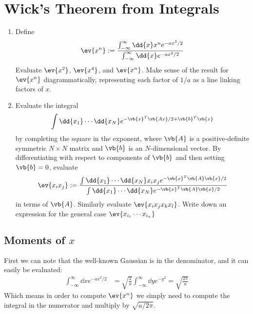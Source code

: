 \documentclass[12pt]{article}
\begin{document}
\section{Wick's Theorem from Integrals}
\begin{problem}
  \begin{enumerate}
  \item Define
    \begin{align*}
      \ev{x^n}:=\frac{\int_{-\infty}^\infty\dd{x}x^ne^{-ax^2/2}}{\int_{-\infty}^\infty\dd{x}e^{-ax^2/2}}
    \end{align*}
    Evaluate $\ev{x^2}$, $\ev{x^4}$, and $\ev{x^n}$. Make sense of the result for $\ev{x^n}$ diagrammatically, representing each factor of $1/a$ as a line linking factors of $x$.
  \item Evaluate the integral
    \begin{align*}
      \int\dd{x_1}\cdots\dd{x_N}e^{-\vb{x}^T\vb{Ax}/2+\vb{b}^T\vb{x}}
    \end{align*}
    by completing the square in the exponent, where $\vb{A}$ is a positive-definite symmetric $N\times N$ matrix and $\vb{b}$ is an $N$-dimensional vector. By differentiating with respect to components of $\vb{b}$ and then setting $\vb{b}=0$, evaluate
    \begin{align*}
      \ev{x_ix_j}:=\frac{\int\dd{x_1}\cdots\dd{x_N}x_ix_je^{-\vb{x}^T\vb{A}\vb{x}/2}}{\int\dd{x_1}\cdots\dd{x_N}e^{-\vb{x}^T\vb{A}\vb{x}/2}}
    \end{align*}
    in terms of $\vb{A}$. Similarly evaluate $\ev{x_ix_jx_kx_l}$. Write down an expression for the general case $\ev{x_{i_1}\cdots x_{i_n}}$
  \end{enumerate}
\end{problem}
\subsection{Moments of $x$}
First we can note that the well-known Gaussian is in the denominator, and it can easily be evaluated:
\begin{align*}
  \int_{-\infty}^\infty\dd{x}e^{-ax^2/2}&=\sqrt{\frac2a}\int_{-\infty}^\infty\dd{y}e^{-y^2}=\sqrt{\frac{2\pi}{a}}
\end{align*}
Which means in order to compute $\ev{x^n}$ we simply need to compute the integral in the numerator and multiply by $\sqrt{a/2\pi}$. 
\end{document}
